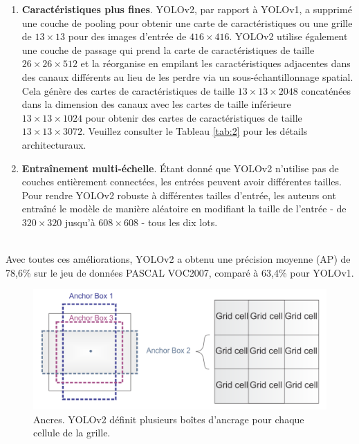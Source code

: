 \documentclass{article}
\begin{document}
\begin{enumerate}
    \item \textbf{Caractéristiques plus fines}. YOLOv2, par rapport à YOLOv1, a supprimé une couche de pooling pour obtenir une carte de caractéristiques ou une grille de $13 \times 13$ pour des images d'entrée de $416 \times 416$. YOLOv2 utilise également une couche de passage qui prend la carte de caractéristiques de taille $26 \times 26 \times 512$ et la réorganise en empilant les caractéristiques adjacentes dans des canaux différents au lieu de les perdre via un sous-échantillonnage spatial. Cela génère des cartes de caractéristiques de taille $13 \times 13 \times 2048$ concaténées dans la dimension des canaux avec les cartes de taille inférieure $13 \times 13 \times 1024$ pour obtenir des cartes de caractéristiques de taille $13 \times 13 \times 3072$. Veuillez consulter le Tableau \ref{tab:2} pour les détails architecturaux.
    \item \textbf{Entraînement multi-échelle}. Étant donné que YOLOv2 n'utilise pas de couches entièrement connectées, les entrées peuvent avoir différentes tailles. Pour rendre YOLOv2 robuste à différentes tailles d'entrée, les auteurs ont entraîné le modèle de manière aléatoire en modifiant la taille de l'entrée - de $320 \times 320$ jusqu'à $608 \times 608$ - tous les dix lots.
\end{enumerate}

\vspace{0.2cm}\\

Avec toutes ces améliorations, YOLOv2 a obtenu une précision moyenne (AP) de 78,6\% sur le jeu de données PASCAL VOC2007, comparé à 63,4\% pour YOLOv1.

\begin{figure}[htbp]
    \centering
    \includegraphics[scale=0.25]{Figures/anchor.png}
    \caption{Ancres. YOLOv2 définit plusieurs boîtes d'ancrage pour chaque cellule de la grille.}
    \label{fig:anchor}
\end{figure}
\end{document}

